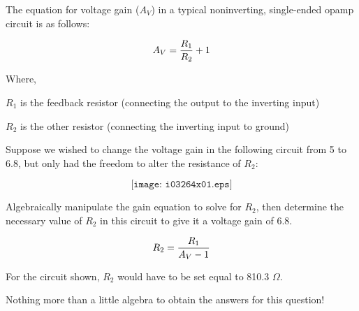 

The equation for voltage gain ($A_V$) in a typical noninverting, single-ended opamp circuit is as follows:

$$A_V = {R_{1} \over R_{2}} + 1$$

\noindent
Where,

$R_1$ is the feedback resistor (connecting the output to the inverting input)

$R_2$ is the other resistor (connecting the inverting input to ground)

\vskip 10pt

Suppose we wished to change the voltage gain in the following circuit from 5 to 6.8, but only had the freedom to alter the resistance of $R_{2}$:

$$\texttt{[image: i03264x01.eps]}$$

Algebraically manipulate the gain equation to solve for $R_2$, then determine the necessary value of $R_2$ in this circuit to give it a voltage gain of 6.8.







$$R_2 = {R_1 \over {A_V - 1}}$$

\vskip 10pt

For the circuit shown, $R_2$ would have to be set equal to 810.3 $\Omega$.







Nothing more than a little algebra to obtain the answers for this question!




